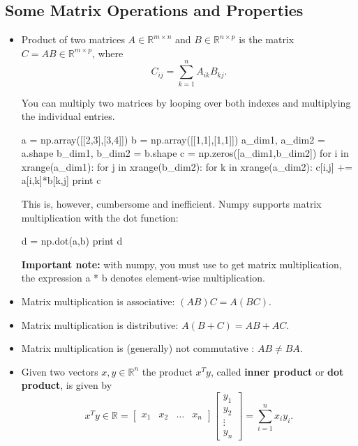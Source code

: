 \subsection{Some Matrix Operations and Properties}
\begin{itemize}
\item Product of two matrices $A \in \mathbb{R}^{m\times n}$ and $B \in \mathbb{R}^{n\times p}$
is the matrix $C=AB \in \mathbb{R}^{m\times p}$, where 
\begin{equation*}
C_{ij}=\sum\limits_{k=1}^{n}A_{ik}B_{kj}.
\end{equation*}

\begin{exercise}
You can multiply two matrices by looping over both indexes and multiplying the individual entries.
\begin{python}
a = np.array([[2,3],[3,4]])
b = np.array([[1,1],[1,1]])
a_dim1, a_dim2 = a.shape
b_dim1, b_dim2 = b.shape
c = np.zeros([a_dim1,b_dim2])
for i in xrange(a_dim1):
   for j in xrange(b_dim2):
       for k in xrange(a_dim2):
          c[i,j] += a[i,k]*b[k,j]
print c
\end{python}

This is, however, cumbersome and inefficient. Numpy supports matrix multiplication with the dot function:

\begin{python}
d = np.dot(a,b)
print d
\end{python}

\textbf{Important note:} with numpy, you must use  to get matrix multiplication, the expression {a * b} denotes element-wise multiplication.
\end{exercise}

\item Matrix multiplication is associative: $(AB)C= A(BC)$.
\item Matrix multiplication is distributive: $A(B+C)= AB + AC$.
\item Matrix multiplication is (generally) not commutative : $AB \neq BA$.
\item Given two vectors $x,y \in \mathbb{R}^{n}$ the product $x^{T}y$, called {\bf inner product}
or {\bf dot product}, is given by
\begin{equation*}
x^{T}y \in \mathbb{R} = \left[\begin{array}{cccc}
x_{1}&x_{2}&\ldots&x_{n}\end{array}\right] \left[\begin{array}{c}
y_{1} \\
y_{2} \\
\vdots \\
y_{n}
\end{array}\right] = \sum\limits_{i=1}^{n}x_{i}y_{i}.
\end{equation*}


\end{itemize}
